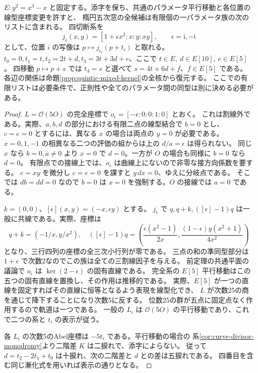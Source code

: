 \begin{corollary}\label{cor:quintic-finite-elliptic-parameters}
$E:y^2=x^3-x$ と固定する。添字を保ち、共通のパラメータ平行移動と各位置の線型座標変更を許すと、
楕円五次窓の全候補は有限個の一パラメータ族の次のリストに含まれる。
四切断系を
\[
 j_\epsilon(x,y)=[1+\epsilon x^2:x:y:xy],\qquad \epsilon=\mathrm i,-\mathrm i
\]
として、位置 $i$ の写像は $p\mapsto j_{\epsilon_i}(p+t_i)$ と取れる。
$t_0=0,t_1=t,t_2=2t+d,t_3=3t+3d+e$、ここで $t\in E,\ d\in E[10],\ e\in E[5]$。
四移動 $p\mapsto p+s$ では $t_4=s$ と選べて $s=4t+6d+f$、$f\in E[5]$ である。
各辺の関係は命題\ref{prop:quintic-mixed-kernel}の全核から復元する。
ここでの有限リストは必要条件で、正則性や全てのパラメータ間の同型は別に決める必要がある。
\end{corollary}
\begin{proof}
$L=\mathcal O(5O)$ の完全座標で $o_\epsilon=[-\epsilon:0:0:1:0]$ とおく。
これは割線外である。実際、$a,b,d$ の部分における有限二点の線型結合で $b=0$ とし、
$c=e=0$ とするには、異なる $x$ の場合は両点の $y=0$ が必要である。
$x=0,1,-1$ の相異なる二つの評価の組からは上の $d/a=\epsilon$ は得られない。
同じ $x$ なら $b=0,a\ne0$ より $x=0$ で $d=0$。一方が $O$ の場合も同様に $b=0$ なら $d=0$。
有限点での接線上では、$o_\epsilon$ は曲線上にないので非零な接方向係数を要する。
$e=xy$ を微分し $c=e=0$ を課すと $y\,dx=0$、ゆえに分岐点である。
そこでは $db=dd=0$ なので $b=0$ は $x=0$ を強制する。$O$ の接線では $a=0$ である。

$k=(0,0)$、$[\epsilon](x,y)=(-x,\epsilon y)$ とする。
$j_\epsilon$ で $q,q+k,([\epsilon]-1)q$ は一般に共線である。実際、座標は
\[
 q+k=(-1/x,y/x^2),\quad
 ([\epsilon]-1)q=\left(\frac{\epsilon(x^2-1)}{2x},\frac{(1-\epsilon)y(x^2+1)}{4x^2}\right)
\]
となり、三行四列の座標の全三次小行列が零である。
三点の和の準同型部分は $1+\epsilon$ で次数2なのでこの族は全ての三割線因子を与える。
前定理の共通平面の議論で $o_\epsilon$ は $\ker(2-\epsilon)$ の固有直線である。
完全系の $E[5]$ 平行移動はこの五つの固有直線を置換し、その作用は推移的である。
実際、$E[5]$ が一つの直線を固定すればその直線に恒等となるよう表現を線型化でき、
$L$ が次数25の商を通じて降下することになり次数5に反する。
位数25の群が五点に固定点なく作用するので軌道は一つである。
一般の $L_i$ は $\mathcal O(5O)$ の平行移動であり、これで二つの系と $t_i$ の表示が従う。

各 $L_i$ の次数5のAbel座標は $-5t_i$ である。平行移動の場合の
系\ref{cor:curve-divisor-monodromy}より二階差 $K$ は二捩れで、添字によらない。
従って $d=t_2-2t_1+t_0$ は十捩れ、次の二階差と $d$ との差は五捩れである。
四番目を含む同じ漸化式を用いれば表示の通りとなる。
\end{proof}

